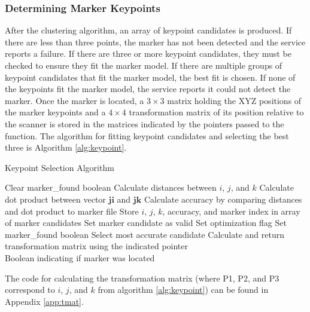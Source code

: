 \subsubsection{Determining Marker Keypoints}
After the clustering algorithm, an array of keypoint candidates is produced. If there are less than three points, the marker has not been detected and the service reports a failure. If there are three or more keypoint candidates, they must be checked to ensure they fit the marker model. If there are multiple groups of keypoint candidates that fit the marker model, the best fit is chosen. If none of the keypoints fit the marker model, the service reports it could not detect the marker. Once the marker is located, a $3\times3$ matrix holding the XYZ positions of the marker keypoints and a $4\times4$ transformation matrix of its position relative to the scanner is stored in the matrices indicated by the pointers passed to the function. The algorithm for fitting keypoint candidates and selecting the best three is Algorithm \ref{alg:keypoint}.
\begin{spacing}{0.8}
\begin{algorithm}[H]
\caption{Keypoint Selection Algorithm}
\label{alg:keypoint}
\begin{algorithmic}[1]
\begin{raggedright}
\State Clear marker\_found boolean
\State Calculate distances between $i$, $j$, and $k$
\State Calculate dot product between vector $\mathbf{ji}$ and $\mathbf{jk}$
\State Calculate accuracy by comparing distances and dot product to marker file
\EndFor
\State Store $i$, $j$, $k$, accuracy, and marker index in array of marker candidates
\State Set marker candidate as valid
\State Set optimization flag
\EndIf
\EndIf
\EndIf
\EndFor
\EndFor
\EndFor
{}
\State Set marker\_found boolean
\State Select most accurate candidate
\EndIf
\State Calculate and return transformation matrix using the indicated pointer \
\EndIf
\EndFunction\\
\Return Boolean indicating if marker was located
\end{raggedright}
\end{algorithmic}
\end{algorithm}
\end{spacing}
The code for calculating the transformation matrix (where P1, P2, and P3 correspond to $i$, $j$, and $k$ from algorithm \ref{alg:keypoint}) can be found in Appendix \ref{app:tmat}.\\

